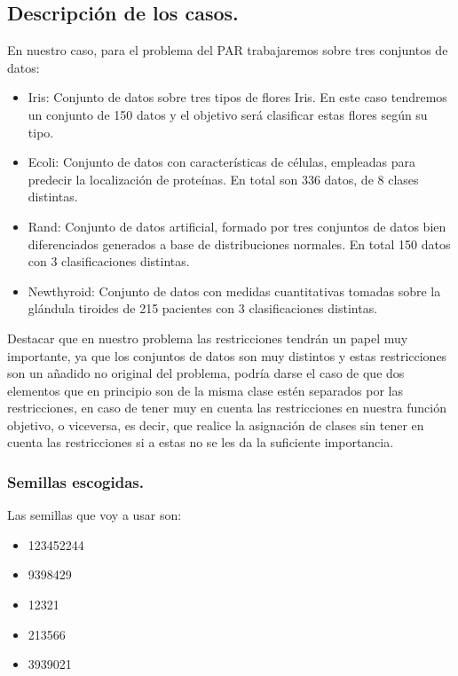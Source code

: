 \documentclass[12pt, spanish]{article}
\begin{document}
\subsection{Descripción de los casos.}

En nuestro caso, para el problema del PAR trabajaremos sobre tres conjuntos de datos:

\begin{itemize}
	\item{Iris: Conjunto de datos sobre tres tipos de flores Iris. En este caso tendremos un conjunto de 150 datos y el objetivo será clasificar estas flores según su tipo.}
	\item{Ecoli: Conjunto de datos con características de células, empleadas para predecir la localización de proteínas. En total son 336 datos, de 8 clases distintas.}
	\item{Rand: Conjunto de datos artificial, formado por tres conjuntos de datos bien diferenciados generados a base de distribuciones normales. En total 150 datos con 3 clasificaciones distintas.}
	\item{Newthyroid: Conjunto de datos con medidas cuantitativas tomadas sobre la glándula tiroides de 215 pacientes con 3 clasificaciones distintas.}
\end{itemize}

Destacar que en nuestro problema las restricciones tendrán un papel muy importante, ya que los conjuntos de datos son muy distintos y estas restricciones son un añadido no original del problema, podría darse el caso de que dos elementos que en principio son de la misma clase estén separados por las restricciones, en caso de tener muy en cuenta las restricciones en nuestra función objetivo, o viceversa, es decir, que realice la asignación de clases sin tener en cuenta las restricciones si a estas no se les da la suficiente importancia.


\subsubsection{Semillas escogidas.}

Las semillas que voy a usar son:

\begin{itemize}
	\item {123452244}
	\item {9398429}
	\item {12321}
	\item {213566}
	\item {3939021}
\end{itemize}
\end{document}
